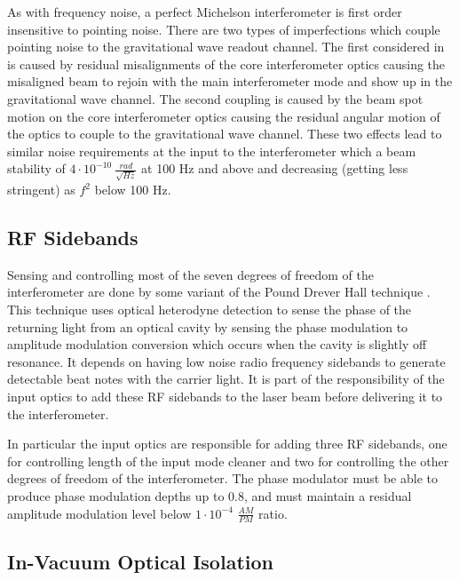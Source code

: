 As with frequency noise, a perfect Michelson interferometer is first order insensitive to pointing 
noise.  
There are two types of imperfections which couple pointing noise to the gravitational wave 
readout channel.  
The first considered in \cite{ligo_T020022} is caused by residual misalignments of the core interferometer 
optics causing the misaligned beam to rejoin with the main interferometer mode and show up 
in the gravitational wave channel.  
The second coupling is caused by the beam spot motion on the core interferometer optics 
causing the residual angular motion of the optics to couple to the gravitational wave channel.  
These two effects lead to similar noise requirements at the input to the interferometer which 
a beam stability of $4\cdot10^{-10}\ \frac{rad}{\sqrt{Hz}}$ at 100 Hz and above and decreasing 
(getting less stringent) as $f^2$ below 100 Hz.


\subsection{RF Sidebands}
\label{sec:rf_sidebands}

Sensing and controlling most of the seven degrees of freedom of the interferometer are done by some 
variant of the Pound Drever Hall technique \cite{drever_laser_1983}.  
This technique uses optical heterodyne detection to sense the phase of the returning light from 
an optical cavity by sensing the phase modulation to amplitude modulation conversion which occurs 
when the cavity is slightly off resonance.  
It depends on having low noise radio frequency sidebands to generate detectable beat notes 
with the carrier light.
It is part of the responsibility of the input optics to add these RF sidebands to the laser beam 
before delivering it to the interferometer.  

In particular the input optics are responsible for adding three RF sidebands, one for controlling 
length of the input mode cleaner and two for controlling the other degrees of freedom of the 
interferometer.  
The phase modulator must be able to produce phase modulation depths up to 0.8, and must 
maintain a residual amplitude modulation level below $1\cdot10^{-4}$ $\frac{AM}{PM}$ ratio.  


\subsection{In-Vacuum Optical Isolation}
\label{sec:in-vacuum_optical_isolation}


